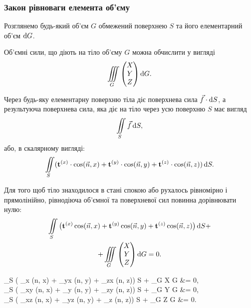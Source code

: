 \subsubsection{Закон рівноваги елемента об'єму}

Розглянемо будь-який об'єм $G$ обмежений поверхнею $S$ та його елементарний об'єм $\mathop{}\!\mathrm{d} G$. \medskip

Об'ємні сили, що діють на тіло об'єму $G$ можна обчислити у вигляді
\begin{equation}
	\displaystyle\iiint\limits_G \begin{pmatrix} X \\ Y \\ Z \end{pmatrix} \mathop{}\!\mathrm{d} G.
\end{equation}

Через будь-яку елементарну поверхню тіла діє поверхнева сила $\vec f \cdot \mathop{}\!\mathrm{d} S$, а результуюча поверхнева сила, яка діє на тіло через усю поверхню $S$ має вигляд 
\begin{equation}
	\displaystyle\iint\limits_S \vec f \mathop{}\!\mathrm{d} S,
\end{equation}
або, в скалярному вигляді:
\begin{equation}
	\displaystyle\iint\limits_S ( \textbf{t}^{(x)} \cdot \cos ( \vec n, x ) + \textbf{t}^{(y)} \cdot \cos(\vec n, y) + \textbf{t}^{(z)} \cdot \cos (\vec n, z) ) \mathop{}\!\mathrm{d} S.
\end{equation}

\begin{law*}
	Для того щоб тіло знаходилося в стані спокою або рухалось рівномірно і прямолінійно, рівнодіюча об'ємної та поверхневої сил повинна дорівнювати нулю:
	\begin{multline}
		\displaystyle\iint\limits_S \big( \textbf{t}^{(x)} \cos(\vec n, x) + \textbf{t}^{(y)} \cos(\vec n, y) + \textbf{t}^{(z)} \cos(\vec n, z) \big) \mathop{}\!\mathrm{d} S + \\ 
		+ \displaystyle\iiint\limits_G \begin{pmatrix} X \\ Y \\ Z \end{pmatrix} \mathop{}\!\mathrm{d} G = 0.
	\end{multline}
\end{law*}

\begin{law*}
	\begin{system}
		\Iint_S \left( \sigma_x \cos(\vec n, x) + \tau_{yx} \cos(\vec n, y) + \tau_{zx} \cos(\vec n, z)\right) \diff S + \Iiint_G X \diff G &= 0, \\
		\Iint_S \left( \tau_{xy} \cos(\vec n, x) + \sigma_y \cos(\vec n, y) + \tau_{zy} \cos(\vec n, z)\right) \diff S + \Iiint_G Y \diff G &= 0, \\
		\Iint_S \left( \tau_{xz} \cos(\vec n, x) + \tau_{yz} \cos(\vec n, y) + \sigma_z \cos(\vec n, z)\right) \diff S + \Iiint_G Z \diff G &= 0.
	\end{system}
\end{law*}

